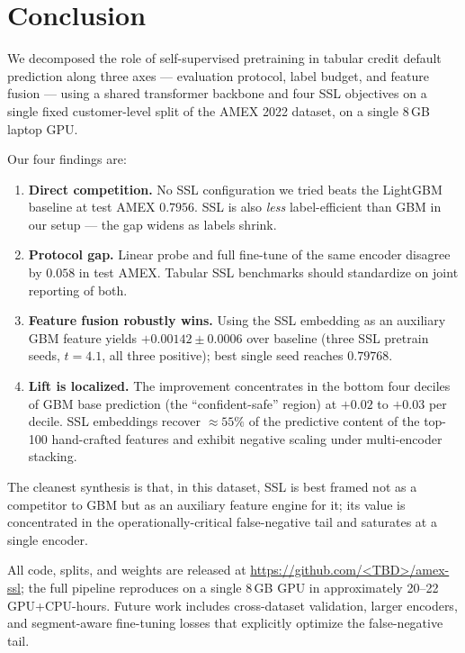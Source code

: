 \documentclass[sigconf, anonymous, review]{acmart}
\begin{document}
\section{Conclusion}
\label{sec:conclusion}

We decomposed the role of self-supervised pretraining in tabular
credit default prediction along three axes --- evaluation protocol,
label budget, and feature fusion --- using a shared transformer
backbone and four SSL objectives on a single fixed customer-level
split of the AMEX 2022 dataset, on a single 8\,GB laptop GPU.

Our four findings are:

\begin{enumerate}
  \item \textbf{Direct competition.} No SSL configuration we tried
        beats the LightGBM baseline at test AMEX $0.7956$. SSL is
        also \emph{less} label-efficient than GBM in our setup ---
        the gap widens as labels shrink.
  \item \textbf{Protocol gap.} Linear probe and full fine-tune of the
        same encoder disagree by $0.058$ in test AMEX. Tabular SSL
        benchmarks should standardize on joint reporting of both.
  \item \textbf{Feature fusion robustly wins.} Using the SSL
        embedding as an auxiliary GBM feature yields
        $+0.00142 \pm 0.0006$ over baseline (three SSL pretrain
        seeds, $t = 4.1$, all three positive); best single seed
        reaches $0.79768$.
  \item \textbf{Lift is localized.} The improvement concentrates in
        the bottom four deciles of GBM base prediction (the
        ``confident-safe'' region) at $+0.02$ to $+0.03$ per decile.
        SSL embeddings recover $\approx 55\%$ of the predictive
        content of the top-100 hand-crafted features and exhibit
        negative scaling under multi-encoder stacking.
\end{enumerate}

The cleanest synthesis is that, in this dataset, SSL is best framed
not as a competitor to GBM but as an auxiliary feature engine for it;
its value is concentrated in the operationally-critical
false-negative tail and saturates at a single encoder.

All code, splits, and weights are released at
\url{https://github.com/<TBD>/amex-ssl}; the full pipeline reproduces
on a single 8\,GB GPU in approximately 20--22 GPU+CPU-hours. Future
work includes cross-dataset validation, larger encoders, and
segment-aware fine-tuning losses that explicitly optimize the
false-negative tail.
\end{document}
